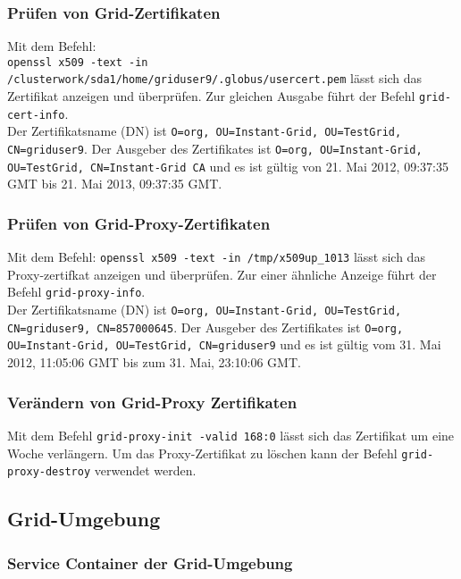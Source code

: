 	\subsubsection{Prüfen von Grid-Zertifikaten}
		Mit dem Befehl: \\
		\texttt{openssl x509 -text -in /clusterwork/sda1/home/griduser9/.globus/usercert.pem}
		lässt sich das Zertifikat anzeigen und überprüfen.
		Zur gleichen Ausgabe führt der Befehl \texttt{grid-cert-info}.\\
		Der Zertifikatsname (DN) ist \texttt{O=org, OU=Instant-Grid, OU=TestGrid, CN=griduser9}.
		Der Ausgeber des Zertifikates ist \texttt{O=org, OU=Instant-Grid, OU=TestGrid, CN=Instant-Grid CA}
		und es ist gültig von 21. Mai 2012, 09:37:35 GMT bis 21. Mai 2013, 09:37:35 GMT.
		
	\subsubsection{Prüfen von Grid-Proxy-Zertifikaten}
		Mit dem Befehl:
		\texttt{openssl x509 -text -in /tmp/x509up\_1013}
		lässt sich das Proxy-zertifkat anzeigen und überprüfen.
		Zur einer ähnliche Anzeige führt der Befehl 
		\texttt{grid-proxy-info}.\\
		Der Zertifikatsname (DN) ist \texttt{O=org, OU=Instant-Grid, OU=TestGrid, CN=griduser9, CN=857000645}.
		Der Ausgeber des Zertifikates ist \texttt{O=org, OU=Instant-Grid, OU=TestGrid, CN=griduser9}
		und es ist gültig vom 31. Mai 2012, 11:05:06 GMT bis zum 31. Mai, 23:10:06 GMT.
		
	\subsubsection{Verändern von Grid-Proxy Zertifikaten}
		Mit dem Befehl
		\texttt{grid-proxy-init -valid 168:0}
		lässt sich das Zertifikat um eine Woche verlängern.
		Um das Proxy-Zertifikat zu löschen kann der Befehl
		\texttt{grid-proxy-destroy}
		verwendet werden.

\subsection{Grid-Umgebung}
	\subsubsection{Service Container der Grid-Umgebung}
	
